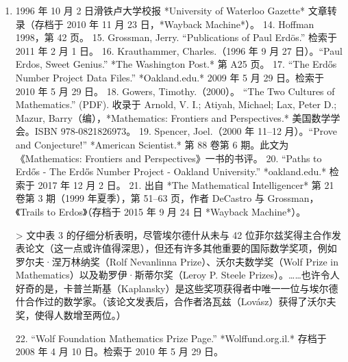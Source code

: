 \begin{enumerate}
\item 1996 年 10 月 2 日滑铁卢大学校报 *University of Waterloo Gazette* 文章转录（存档于 2010 年 11 月 23 日，*Wayback Machine*）。
14. Hoffman 1998，第 42 页。
15. Grossman, Jerry. “Publications of Paul Erdös.” 检索于 2011 年 2 月 1 日。
16. Krauthammer, Charles.（1996 年 9 月 27 日）。“Paul Erdos, Sweet Genius.” *The Washington Post.* 第 A25 页。
17. “The Erdős Number Project Data Files.” *Oakland.edu.* 2009 年 5 月 29 日。检索于 2010 年 5 月 29 日。
18. Gowers, Timothy.（2000）。 “The Two Cultures of Mathematics.” (PDF). 收录于 Arnold, V. I.; Atiyah, Michael; Lax, Peter D.; Mazur, Barry（编），*Mathematics: Frontiers and Perspectives.* 美国数学学会。ISBN 978-0821826973。
19. Spencer, Joel.（2000 年 11–12 月）。“Prove and Conjecture!” *American Scientist.* 第 88 卷第 6 期。此文为《Mathematics: Frontiers and Perspectives》一书的书评。
20. “Paths to Erdős - The Erdős Number Project - Oakland University.” *oakland.edu.* 检索于 2017 年 12 月 2 日。
21. 出自 *The Mathematical Intelligencer* 第 21 卷第 3 期（1999 年夏季），第 51–63 页，作者 DeCastro 与 Grossman，《Trails to Erdos》（存档于 2015 年 9 月 24 日 *Wayback Machine*）。

> 文中表 3 的仔细分析表明，尽管埃尔德什从未与 42 位菲尔兹奖得主合作发表论文（这一点或许值得深思），但还有许多其他重要的国际数学奖项，例如罗尔夫·涅万林纳奖（Rolf Nevanlinna Prize）、沃尔夫数学奖（Wolf Prize in Mathematics）以及勒罗伊·斯蒂尔奖（Leroy P. Steele Prizes）。……也许令人好奇的是，卡普兰斯基（Kaplansky）是这些奖项获得者中唯一一位与埃尔德什合作过的数学家。（该论文发表后，合作者洛瓦兹（Lovász）获得了沃尔夫奖，使得人数增至两位。）

22. “Wolf Foundation Mathematics Prize Page.” *Wolffund.org.il.* 存档于 2008 年 4 月 10 日。检索于 2010 年 5 月 29 日。

\end{enumerate}